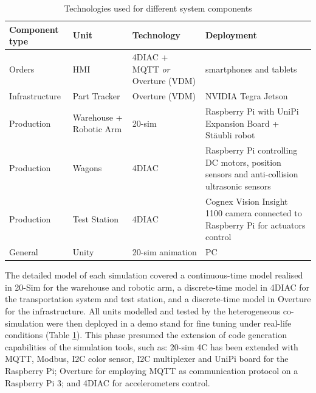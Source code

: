 \begin{table}[ht]
	\centering
		\begin{tabular}{|p{2.4cm}|p{1.8cm}|p{3.2cm}|p{4cm}|}\hline
			\textbf{Component type} & \textbf{Unit} & \textbf{Technology} & \textbf{Deployment}\\
			\hline\hline
			Orders & HMI & 4DIAC + MQTT \textit{or} Overture (VDM) & smartphones and tablets \\ \hline
			Infrastructure & Part Tracker & Overture (VDM) & NVIDIA Tegra Jetson\\ \hline
			Production & Warehouse + Robotic Arm & 20-sim & Raspberry Pi with UniPi Expansion Board + Stäubli robot\\ \hline
			Production & Wagons & 4DIAC & Raspberry Pi controlling DC motors, position sensors and anti-collision ultrasonic sensors \\ \hline
			Production & Test Station & 4DIAC & Cognex Vision Insight 1100 camera connected to Raspberry Pi for actuators control\\ \hline
			General & Unity & 20-sim animation & PC\\\hline
		\end{tabular}
	\caption{Technologies used for different system components}
	\label{tab:iPP4CPPS_technologies}
\end{table}

The detailed model of each simulation covered a continuous-time model realised in 20-Sim for the warehouse and robotic arm, a discrete-time model in 4DIAC for the transportation system and test station, and a discrete-time model in Overture for the infrastructure. All units modelled and tested by the heterogeneous co-simulation were then deployed in a demo stand for fine tuning under real-life conditions (Table \ref{tab:iPP4CPPS_technologies}). This phase presumed the extension of code generation capabilities of the simulation tools, such as: 20-sim 4C has been extended with MQTT, Modbus, I2C color sensor, I2C multiplexer and UniPi board for the Raspberry Pi; Overture for employing MQTT as communication protocol on a Raspberry Pi 3; and 4DIAC for accelerometers control. 

